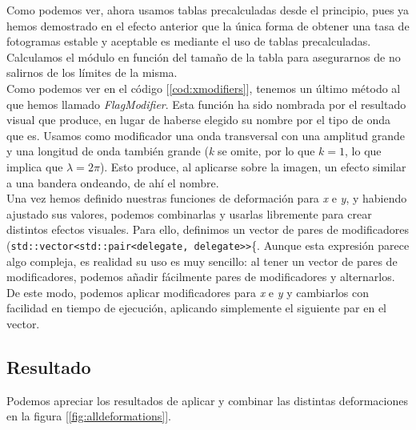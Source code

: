Como podemos ver, ahora usamos tablas precalculadas desde el principio, pues ya hemos demostrado en el efecto anterior que la única forma de obtener una tasa de fotogramas estable y aceptable es mediante el uso de tablas precalculadas. Calculamos el módulo en función del tamaño de la tabla para asegurarnos de no salirnos de los límites de la misma.\\

Como podemos ver en el código [\ref{cod:xmodifiers}], tenemos un último método al que hemos llamado \emph{FlagModifier}. Esta función ha sido nombrada por el resultado visual que produce, en lugar de haberse elegido su nombre por el tipo de onda que es. Usamos como modificador una onda transversal con una amplitud grande y una longitud de onda también grande (\emph{k} se omite, por lo que \(k = 1\), lo que implica que \(\lambda = 2 \pi\)). Esto produce, al aplicarse sobre la imagen, un efecto similar a una bandera ondeando, de ahí el nombre.\\

Una vez hemos definido nuestras funciones de deformación para \emph{x} e \emph{y}, y habiendo ajustado sus valores, podemos combinarlas y usarlas libremente para crear distintos efectos visuales. Para ello, definimos un vector de pares de modificadores (\lstinline{std::vector<std::pair<delegate, delegate>>}\{. Aunque esta expresión parece algo compleja, es realidad su uso es muy sencillo: al tener un vector de pares de modificadores, podemos añadir fácilmente pares de modificadores y alternarlos. De este modo, podemos aplicar modificadores para \emph{x} e \emph{y} y cambiarlos con facilidad en tiempo de ejecución, aplicando simplemente el siguiente par en el vector.\\

\subsection{Resultado}

Podemos apreciar los resultados de aplicar y combinar las distintas deformaciones en la figura [\ref{fig:alldeformations}].

